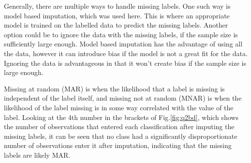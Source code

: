     Generally, there are multiple ways to handle missing labels.
    One such way is model based imputation, which was used here.
    This is where an appropriate model is trained on the labelled data to predict the missing labels.
    Another option could be to ignore the data with the missing labels, if the sample size is sufficiently large enough.
    Model based imputation has the advantage of using all the data, however it can introduce bias if the model is not
    a great fit for the data.
    Ignoring the data is advantageous in that it won't create bias if the sample size is large enough.

    Missing at random (MAR) is when the likelihood that a label is missing is independent of the label itself, and
    missing not at random (MNAR) is when the likelihood of the label missing is in some way correlated with the value
    of the label.
    Looking at the 4th number in the brackets of Fig.\eqref{fig:q2bd}, which shows the number of observations that
    entered each classification after imputing the missing labels, it can be seen that no class had
    a significantly disproportionate number of observations enter it after imputation, indicating that the missing
    labels are likely MAR.
